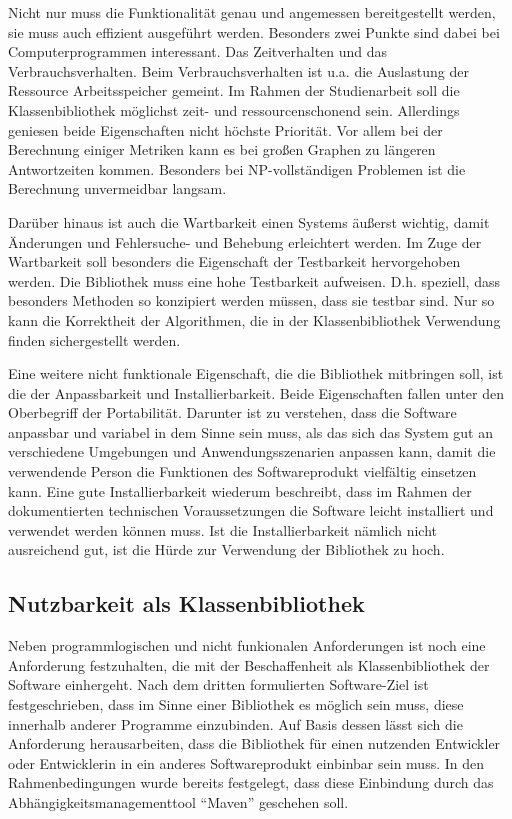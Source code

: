 \documentclass[a4paper,12pt,ngerman,chapterprefix=false,listof=totoc,bibliography=totoc]{scrreprt}
\begin{document}
{{{Nicht nur muss die Funktionalität genau und angemessen bereitgestellt werden, sie muss auch effizient ausgeführt werden. Besonders zwei Punkte sind dabei bei Computerprogrammen interessant. Das Zeitverhalten und das Verbrauchsverhalten. Beim Verbrauchsverhalten ist u.a. die Auslastung der Ressource Arbeitsspeicher gemeint. Im Rahmen der Studienarbeit soll die Klassenbibliothek möglichst zeit- und ressourcenschonend sein. Allerdings geniesen beide Eigenschaften nicht höchste Priorität. Vor allem bei der Berechnung einiger Metriken kann es bei großen Graphen zu längeren Antwortzeiten kommen. Besonders bei NP-vollständigen Problemen ist die Berechnung unvermeidbar langsam.

Darüber hinaus ist auch die Wartbarkeit einen Systems äußerst wichtig, damit Änderungen und Fehlersuche- und Behebung erleichtert werden. Im Zuge der Wartbarkeit soll besonders die Eigenschaft der Testbarkeit hervorgehoben werden. Die Bibliothek muss eine hohe Testbarkeit aufweisen. D.h. speziell, dass besonders Methoden so konzipiert werden müssen, dass sie testbar sind. Nur so kann die Korrektheit der Algorithmen, die in der Klassenbibliothek Verwendung finden sichergestellt werden.

Eine weitere nicht funktionale Eigenschaft, die die Bibliothek mitbringen soll, ist die der Anpassbarkeit und Installierbarkeit. Beide Eigenschaften fallen unter den Oberbegriff der Portabilität. Darunter ist zu verstehen, dass die Software anpassbar und variabel in dem Sinne sein muss, als das sich das System gut an verschiedene Umgebungen und Anwendungsszenarien anpassen kann, damit die verwendende Person die Funktionen des Softwareprodukt vielfältig einsetzen kann. Eine gute Installierbarkeit wiederum beschreibt, dass im Rahmen der dokumentierten technischen Voraussetzungen die Software leicht installiert und verwendet werden können muss. Ist die Installierbarkeit nämlich nicht ausreichend gut, ist die Hürde zur Verwendung der Bibliothek zu hoch. 
}
\subsection{Nutzbarkeit als Klassenbibliothek}
{
Neben programmlogischen und nicht funkionalen Anforderungen ist noch eine Anforderung festzuhalten, die mit der Beschaffenheit als Klassenbibliothek der Software einhergeht. Nach dem dritten formulierten Software-Ziel ist festgeschrieben, dass im Sinne einer Bibliothek es möglich sein muss, diese innerhalb anderer Programme einzubinden. Auf Basis dessen lässt sich die Anforderung herausarbeiten, dass die Bibliothek für einen nutzenden Entwickler oder Entwicklerin in ein anderes Softwareprodukt einbinbar sein muss. In den Rahmenbedingungen wurde bereits festgelegt, dass diese Einbindung durch das Abhängigkeitsmanagementtool "`Maven"' geschehen soll. 
}
}}
\end{document}

